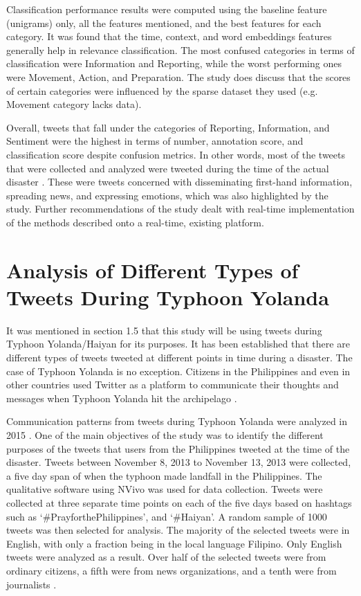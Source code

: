 Classification performance results were computed using the baseline feature (unigrams) only, all the features mentioned, and the best features for each category. It was found that the time, context, and word embeddings features generally help in relevance classification. The most confused categories in terms of classification were Information and Reporting, while the worst performing ones were Movement, Action, and Preparation. The study does discuss that the scores of certain categories were influenced by the sparse dataset they used (e.g. Movement category lacks data). 

Overall, tweets that fall under the categories of Reporting, Information, and Sentiment were the highest in terms of number, annotation score, and classification score despite confusion metrics. In other words, most of the tweets that were collected and analyzed were tweeted during the time of the actual disaster \cite{cat2016}. These were tweets concerned with disseminating first-hand information, spreading news, and expressing emotions, which was also highlighted by the study. Further recommendations of the study dealt with real-time implementation of the methods described onto a real-time, existing platform.

\section{Analysis of Different Types of Tweets During Typhoon Yolanda}
It was mentioned in section 1.5 that this study will be using tweets during Typhoon Yolanda/Haiyan for its purposes. It has been established that there are different types of tweets tweeted at different points in time during a disaster. The case of Typhoon Yolanda is no exception. Citizens in the Philippines and even in other countries used Twitter as a platform to communicate their thoughts and messages when Typhoon Yolanda hit the archipelago \cite{TTC2015}. 

Communication patterns from tweets during Typhoon Yolanda were analyzed in 2015 \cite{TTC2015}. One of the main objectives of the study was to identify the different purposes of the tweets that users from the Philippines tweeted at the time of the disaster. Tweets between November 8, 2013 to November 13, 2013 were collected, a five day span of when the typhoon made landfall in the Philippines. The qualitative software using NVivo was used for data collection. Tweets were collected at three separate time points on each of the five days based on hashtags such as ‘\#PrayforthePhilippines’, and ‘\#Haiyan’. A random sample of 1000 tweets was then selected for analysis. The majority of the selected tweets were in English, with only a fraction being in the local language Filipino. Only English tweets were analyzed as a result. Over half of the selected tweets were from ordinary citizens, a fifth were from news organizations, and a tenth were from journalists \cite{TTC2015}. 

